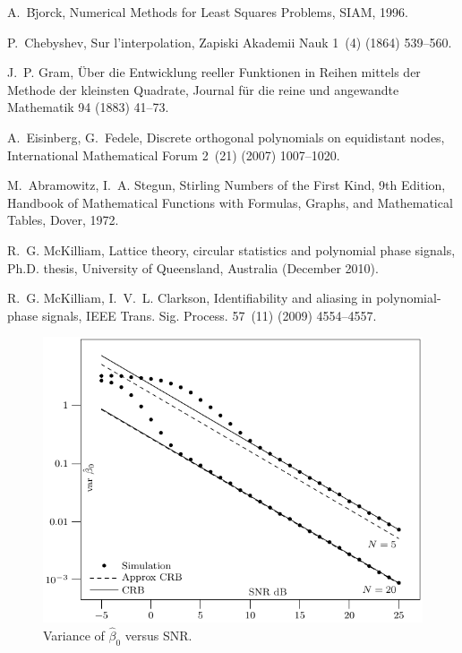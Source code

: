 \documentclass[review]{elsarticle}
\begin{document}
\begin{thebibliography}{10}
A.~B\"{j}orck, Numerical Methods for Least Squares Problems, SIAM, 1996.

P.~Chebyshev, Sur l'interpolation, Zapiski Akademii Nauk 1~(4) (1864) 539--560.

J.~P. Gram, {\"{U}ber die Entwicklung reeller Funktionen in Reihen mittels der
  Methode der kleinsten Quadrate}, Journal f\"{u}r die reine und angewandte
  Mathematik 94 (1883) 41--73.

A.~Eisinberg, G.~Fedele, Discrete orthogonal polynomials on equidistant nodes,
  International Mathematical Forum 2~(21) (2007) 1007--1020.

M.~Abramowitz, I.~A. Stegun, Stirling Numbers of the First Kind, 9th Edition,
  Handbook of Mathematical Functions with Formulas, Graphs, and Mathematical
  Tables, Dover, 1972.

R.~G. McKilliam, Lattice theory, circular statistics and polynomial phase
  signals, Ph.D. thesis, University of Queensland, Australia (December 2010).

R.~G. McKilliam, I.~V.~L. Clarkson, Identifiability and aliasing in
  polynomial-phase signals, IEEE Trans. Sig. Process. 57~(11) (2009)
  4554--4557.

\end{thebibliography}





 \begin{figure}[p]
    	\centering 
   		\includegraphics{fig1.pdf} 
    		\caption{Variance of $\hat{\beta}_0$ versus SNR.} 
    		\label{plot:phase0} 
 \end{figure} 
\end{document}
